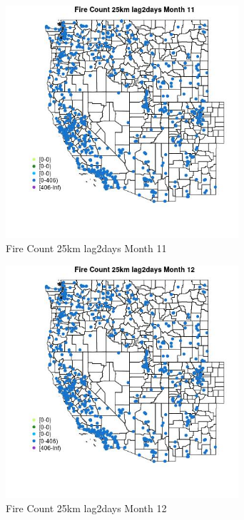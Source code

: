 \begin{figure} 
\centering  
\includegraphics[width=0.77\textwidth]{Code_Outputs/Report_ML_input_PM25_Step4_part_f_de_duplicated_aves_prioritize_24hr_obswNAs_MapObsMo11Fire_Count_25km_lag2days.jpg} 
\caption{\label{fig:Report_ML_input_PM25_Step4_part_f_de_duplicated_aves_prioritize_24hr_obswNAsMapObsMo11Fire_Count_25km_lag2days}Fire Count 25km lag2days Month 11} 
\end{figure} 
 

\clearpage 

\begin{figure} 
\centering  
\includegraphics[width=0.77\textwidth]{Code_Outputs/Report_ML_input_PM25_Step4_part_f_de_duplicated_aves_prioritize_24hr_obswNAs_MapObsMo12Fire_Count_25km_lag2days.jpg} 
\caption{\label{fig:Report_ML_input_PM25_Step4_part_f_de_duplicated_aves_prioritize_24hr_obswNAsMapObsMo12Fire_Count_25km_lag2days}Fire Count 25km lag2days Month 12} 
\end{figure} 
 

